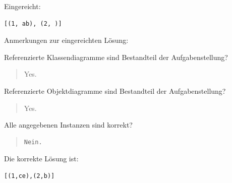 Eingereicht:


\begin{verbatim}
[(1, ab), (2, )]
\end{verbatim}


Anmerkungen zur eingereichten Lösung:

Referenzierte Klassendiagramme sind Bestandteil der Aufgabenstellung?\begin{quote}Yes.\end{quote}Referenzierte Objektdiagramme sind Bestandteil der Aufgabenstellung?\begin{quote}Yes.\end{quote}Alle angegebenen Instanzen sind korrekt?

\begin{quote}
\begin{verbatim}
Nein.
\end{verbatim}
\end{quote}

Die korrekte Lösung ist:
\begin{verbatim}
[(1,ce),(2,b)]
\end{verbatim}


